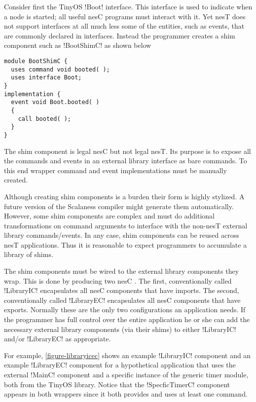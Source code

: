 Consider first the TinyOS !Boot! interface. This interface is used to indicate when a node is
started; all useful nesC programs must interact with it. Yet nesT does not support interfaces at
all much less some of the entities, such as events, that are commonly declared in interfaces.
Instead the programmer creates a shim component such as !BootShimC! as shown below

\singlespace
\vspace{1.0ex}
\begin{lstlisting}[language=nesC]
module BootShimC {
  uses command void booted( );
  uses interface Boot;
}
implementation {
  event void Boot.booted( )
  {
    call booted( );
  }
}
\end{lstlisting}
\vspace{1.0ex}
\primaryspacing

The shim component is legal nesC but not legal nesT. Its purpose is to expose all the commands
and events in an external library interface as bare commands. To this end wrapper command and
event implementations must be manually created.

Although creating shim components is a burden their form is highly stylized. A future version of
the Scalaness compiler might generate them automatically. However, some shim components are
complex and must do additional transformations on command arguments to interface with the
non-nesT external library commands/events. In any case, shim components can be reused across
nesT applications. Thus it is reasonable to expect programmers to accumulate a library of shims.

The shim components must be wired to the external library components they wrap. This is done by
producing two nesC . The first, conventionally called
!LibraryIC! encapsulates all nesC components that have imports. The second, conventionally
called !LibraryEC! encapsulates all nesC components that have exports. Normally these are the
only two configurations an application needs. If the programmer has full control over the entire
application he or she can add the necessary external library components (via their shims) to
either !LibraryIC! and/or !LibraryEC! as appropriate.

For example, \autoref{figure-libraryicec} shows an example !LibraryIC! component and an example
!LibraryEC! component for a hypothetical application that uses the external !MainC! component
and a specific instance of the generic timer module, both from the TinyOS library. Notice that
the !SpecficTimerC! component appears in both wrappers since it both provides and uses at least
one command.

